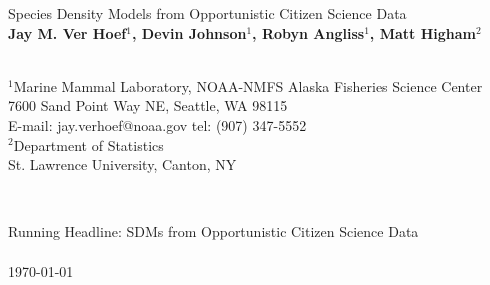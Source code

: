 \documentclass[11pt, titlepage]{article}
\begin{document}

\begin{titlepage}
  \begin{center}
\vspace*{2cm}
{\LARGE Species Density Models from Opportunistic Citizen Science Data} \\
\vspace{1cm}
\textbf{Jay M. Ver Hoef$^1$, Devin Johnson$^1$, Robyn Angliss$^1$, Matt Higham$^2$}  \\
\vspace{1cm}
\hrulefill \\ 
\begin{onehalfspace}
  \begin{flushleft}
$^1$Marine Mammal Laboratory, NOAA-NMFS Alaska Fisheries Science Center\\
\hspace{.5cm} 7600 Sand Point Way NE, Seattle, WA 98115\\
\hspace{.5cm} E-mail: jay.verhoef@noaa.gov \hspace{.5cm} tel: (907) 347-5552\\
$^2$Department of Statistics \\
\hspace{.5cm} St. Lawrence University, Canton, NY 
\end{flushleft}
\hrulefill \\
\end{onehalfspace}
\vspace{.5cm}
Running Headline: SDMs from Opportunistic Citizen Science Data \\
\hrulefill \\
\today
  \end{center}
\end{titlepage}

\modulolinenumbers[5]
\end{document}
